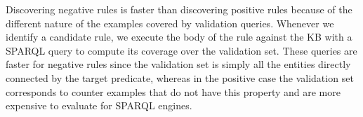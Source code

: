 Discovering negative rules is faster than discovering positive rules
because of the different nature of the examples covered by validation queries. 
Whenever we identify a candidate rule, we execute the body of the rule against the KB with a SPARQL query to compute its coverage over the validation set. 
These queries are faster for negative rules since the validation set is simply all the entities directly connected by the target predicate, whereas in the positive case the validation set corresponds to counter examples that do not have this property and are more expensive to evaluate for SPARQL engines.

%

